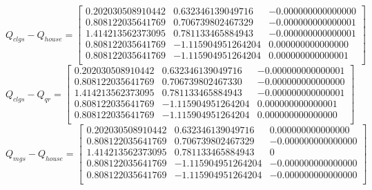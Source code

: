 \documentclass{article}
\begin{document}
            \begin{equation}
                Q_{clgs} - Q_{house} = \left[
                \begin{array}{ccc}
                    0.202030508910442 &  0.632346139049716 & -0.000000000000000\\
                    0.808122035641769 &  0.706739802467329 & -0.000000000000001\\
                    1.414213562373095 &  0.781133465884943 & -0.000000000000001\\
                    0.808122035641769 & -1.115904951264204 &  0.000000000000000\\
                    0.808122035641769 & -1.115904951264204 &  0.000000000000001\\
                \end{array}
                \right]
            \end{equation}
            \begin{equation}
                Q_{clgs} - Q_{qr} = \left[
                \begin{array}{ccc}
                    0.202030508910442 &  0.632346139049716 & -0.000000000000001\\
                    0.808122035641769 &  0.706739802467330 & -0.000000000000000\\
                    1.414213562373095 &  0.781133465884943 & -0.000000000000001\\
                    0.808122035641769 & -1.115904951264204 &  0.000000000000001\\
                    0.808122035641769 & -1.115904951264204 &  0.000000000000000\\
                \end{array}
                \right]
            \end{equation}
            \begin{equation}
                Q_{mgs} - Q_{house} = \left[
                \begin{array}{ccc}
                    0.202030508910442 &  0.632346139049716 &  0.000000000000000\\
                    0.808122035641769 &  0.706739802467329 & -0.000000000000000\\
                    1.414213562373095 &  0.781133465884943 &                  0\\
                    0.808122035641769 & -1.115904951264204 & -0.000000000000000\\
                    0.808122035641769 & -1.115904951264204 & -0.000000000000000\\
                \end{array}
                \right]
            \end{equation}
\end{document}
